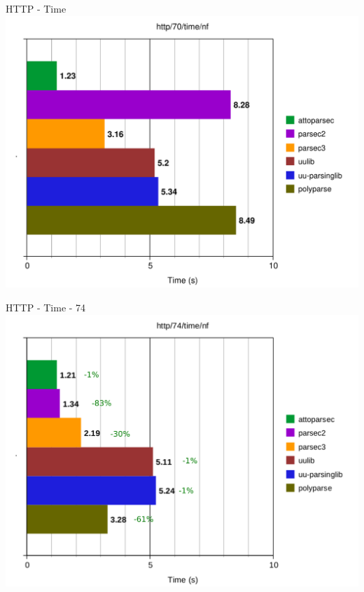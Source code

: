 \documentclass{beamer}
\begin{document}
\begin{frame}{HTTP - Time}
\includegraphics[scale=0.5]{presentation/http-70-time-nf.pdf}
\end{frame}

\begin{frame}{HTTP - Time - 74}
\includegraphics[scale=0.5]{presentation/http-74-time-nf_.pdf}
\end{frame}
\end{document}
